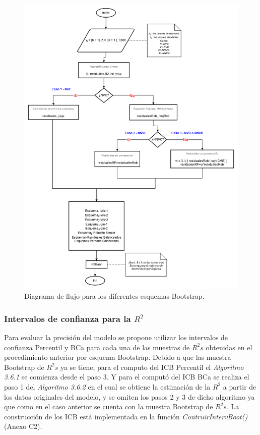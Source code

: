 \begin{figure}[ht!]
	\centering 
	\includegraphics[width=0.7\linewidth]{img/metodologia_v7.png} 
	\caption{Diagrama de flujo para los diferentes esquemas Bootstrap.}
	\label{fig:AlgDifEsqBoots}
\end{figure}
\FloatBarrier

\subsubsection{Intervalos de confianza para la $R^{2}$}

Para evaluar la precisión del modelo se propone utilizar los intervalos de confianza Percentil y BCa para cada una de las muestras de $R^{2}s$ obtenidas en el procedimiento anterior por esquema Bootstrap. Debido a que las muestra Bootstrap de $R^{2}s$ ya se tiene, para el computo del ICB Percentil el \textit{Algoritmo 3.6.1} se comienza desde el paso 3. Y para el computó del ICB BCa se realiza el paso 1 del \textit{Algoritmo 3.6.2} en el cual se obtiene la estimación de la $R^{2}$ a partir de los datos originales del modelo, y se omiten los pasos 2 y 3 de dicho algoritmo ya que como en el caso anterior se cuenta con la muestra Bootstrap de $R^2 s$. La construcción de los ICB está implementada en la función \textit{ContruirIntervBoot()} (Anexo C2). \\



